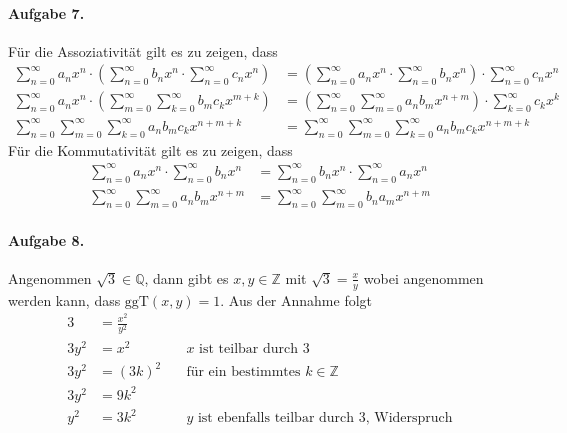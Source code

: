 \documentclass{article}
\begin{document}
\paragraph{Aufgabe 7.} Für die Assoziativität gilt es zu zeigen, dass
\begin{align*}
    \sum_{n = 0}^{\infty}a_n x^n \cdot \left(\sum_{n = 0}^{\infty}b_n x^n \cdot \sum_{n = 0}^{\infty}c_n x^n\right) &= \left(\sum_{n = 0}^{\infty}a_n x^n \cdot \sum_{n = 0}^{\infty}b_n x^n\right) \cdot \sum_{n = 0}^{\infty}c_n x^n \\
    \sum_{n = 0}^{\infty}a_n x^n \cdot \left(\sum_{m = 0}^{\infty}\sum_{k = 0}^{\infty}b_{m} c_{k} x^{m + k}\right) &= \left(\sum_{n = 0}^{\infty} \sum_{m = 0}^{\infty} a_n b_m x^{n + m}\right) \cdot \sum_{k = 0}^{\infty}c_k x^k \\
    \sum_{n = 0}^{\infty}\sum_{m = 0}^{\infty}\sum_{k = 0}^{\infty}a_n b_m c_k x^{n + m + k} &= \sum_{n = 0}^{\infty}\sum_{m = 0}^{\infty}\sum_{k = 0}^{\infty}a_n b_m c_k x^{n + m + k}
\end{align*}
Für die Kommutativität gilt es zu zeigen, dass
\begin{align*}
    \sum_{n = 0}^{\infty} a_n x^n \cdot \sum_{n = 0}^{\infty} b_n x^n &= \sum_{n = 0}^{\infty} b_n x^n \cdot \sum_{n = 0}^{\infty} a_n x^n \\
    \sum_{n = 0}^{\infty}\sum_{m = 0}^{\infty}a_n b_m x^{n + m} &= \sum_{n = 0}^{\infty}\sum_{m = 0}^{\infty}b_n a_m x^{n + m}
\end{align*}

\paragraph{Aufgabe 8.} Angenommen $\sqrt{3} \in \mathbb{Q}$, dann gibt es $x, y \in \mathbb{Z}$ mit $\sqrt{3} = \frac{x}{y}$ wobei angenommen werden kann, dass $\text{ggT}(x, y) = 1$. Aus der Annahme folgt
\begin{align*}
    3 &= \frac{x^2}{y^2} \\
    3y^2 &= x^2 \quad &\text{$x$ ist teilbar durch 3} \\
    3y^2 &= (3k)^2 \quad &\text{f\"ur ein bestimmtes $k \in \mathbb{Z}$} \\
    3y^2 &= 9k^2 \\
    y^2 &= 3k^2 \quad &\text{$y$ ist ebenfalls teilbar durch 3, Widerspruch} \\
\end{align*}
\end{document}
